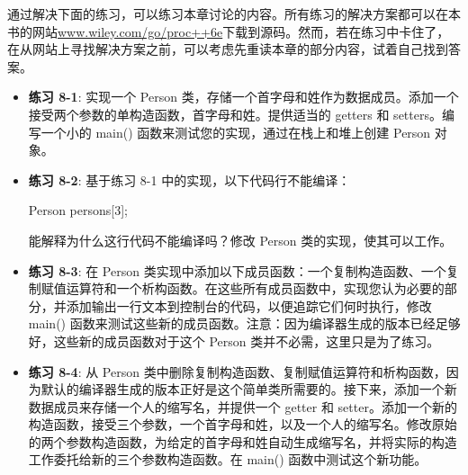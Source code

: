 通过解决下面的练习，可以练习本章讨论的内容。所有练习的解决方案都可以在本书的网站\url{www.wiley.com/go/proc++6e}下载到源码。然而，若在练习中卡住了，在从网站上寻找解决方案之前，可以考虑先重读本章的部分内容，试着自己找到答案。

\begin{itemize}
\item
\textbf{练习 8-1}: 实现一个 Person 类，存储一个首字母和姓作为数据成员。添加一个接受两个参数的单构造函数，首字母和姓。提供适当的 getters 和 setters。编写一个小的 main() 函数来测试您的实现，通过在栈上和堆上创建 Person 对象。

\item
\textbf{练习 8-2}: 基于练习 8-1 中的实现，以下代码行不能编译：

\begin{cpp}
Person persons[3];
\end{cpp}

能解释为什么这行代码不能编译吗？修改 Person 类的实现，使其可以工作。

\item
\textbf{练习 8-3}: 在 Person 类实现中添加以下成员函数：一个复制构造函数、一个复制赋值运算符和一个析构函数。在这些所有成员函数中，实现您认为必要的部分，并添加输出一行文本到控制台的代码，以便追踪它们何时执行，修改 main() 函数来测试这些新的成员函数。注意：因为编译器生成的版本已经足够好，这些新的成员函数对于这个 Person 类并不必需，这里只是为了练习。

\item
\textbf{练习 8-4}: 从 Person 类中删除复制构造函数、复制赋值运算符和析构函数，因为默认的编译器生成的版本正好是这个简单类所需要的。接下来，添加一个新数据成员来存储一个人的缩写名，并提供一个 getter 和 setter。添加一个新的构造函数，接受三个参数，一个首字母和姓，以及一个人的缩写名。修改原始的两个参数构造函数，为给定的首字母和姓自动生成缩写名，并将实际的构造工作委托给新的三个参数构造函数。在 main() 函数中测试这个新功能。
\end{itemize}
